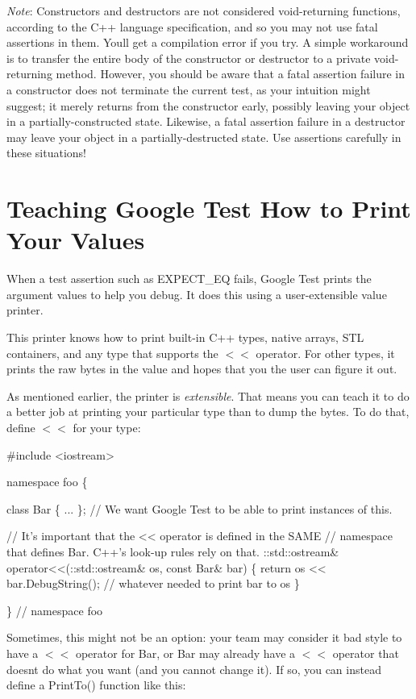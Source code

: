 {\itshape Note}\+: Constructors and destructors are not considered void-\/returning functions, according to the C++ language specification, and so you may not use fatal assertions in them. You\textquotesingle{}ll get a compilation error if you try. A simple workaround is to transfer the entire body of the constructor or destructor to a private void-\/returning method. However, you should be aware that a fatal assertion failure in a constructor does not terminate the current test, as your intuition might suggest; it merely returns from the constructor early, possibly leaving your object in a partially-\/constructed state. Likewise, a fatal assertion failure in a destructor may leave your object in a partially-\/destructed state. Use assertions carefully in these situations!

\section*{Teaching Google Test How to Print Your Values}

When a test assertion such as {\ttfamily E\+X\+P\+E\+C\+T\+\_\+\+EQ} fails, Google Test prints the argument values to help you debug. It does this using a user-\/extensible value printer.

This printer knows how to print built-\/in C++ types, native arrays, S\+TL containers, and any type that supports the {\ttfamily $<$$<$} operator. For other types, it prints the raw bytes in the value and hopes that you the user can figure it out.

As mentioned earlier, the printer is {\itshape extensible}. That means you can teach it to do a better job at printing your particular type than to dump the bytes. To do that, define {\ttfamily $<$$<$} for your type\+:


\begin{DoxyCode}
#include <iostream>

namespace foo \{

class Bar \{ ... \};  // We want Google Test to be able to print instances of this.

// It's important that the << operator is defined in the SAME
// namespace that defines Bar.  C++'s look-up rules rely on that.
::std::ostream& operator<<(::std::ostream& os, const Bar& bar) \{
  return os << bar.DebugString();  // whatever needed to print bar to os
\}

\}  // namespace foo
\end{DoxyCode}


Sometimes, this might not be an option\+: your team may consider it bad style to have a {\ttfamily $<$$<$} operator for {\ttfamily Bar}, or {\ttfamily Bar} may already have a {\ttfamily $<$$<$} operator that doesn\textquotesingle{}t do what you want (and you cannot change it). If so, you can instead define a {\ttfamily Print\+To()} function like this\+:


